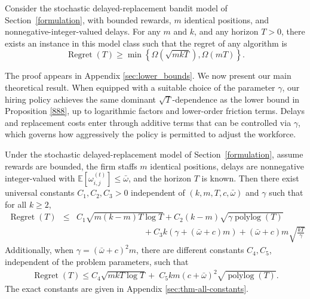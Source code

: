 \documentclass[opre,blindrev]{informs3}
\newcommand{\polylog}{\operatorname{polylog}}
\newcommand{\Regret}{\operatorname{Regret}}
\begin{document}
\begin{proposition} 
\label{888}
Consider the stochastic delayed-replacement bandit model of Section~\ref{formulation}, with bounded rewards, \(m\) identical positions, and nonnegative-integer-valued delays. For any \(m\) and \(k\), and any horizon \(T > 0\), there exists an instance in this model class such that the regret of any algorithm is
\begin{equation*}
    \Regret(T) \geq \min \left\{\Omega\left(\sqrt{mkT}\right), \Omega\left(mT\right) \right\}.
\end{equation*}
\end{proposition}

The proof appears in Appendix \ref{sec:lower_bounds}. We now present our main theoretical result. When equipped with a suitable choice of the parameter \(\gamma\), our hiring policy achieves the same dominant \(\sqrt{T}\)-dependence as the lower bound in Proposition \ref{888}, up to logarithmic factors and lower-order friction terms. Delays and replacement costs enter through additive terms that can be controlled via \(\gamma\), which governs how aggressively the policy is permitted to adjust the workforce. 

\begin{theorem}\label{thm:main}
    Under the stochastic delayed-replacement model of Section~\ref{formulation}, assume rewards are bounded, the firm staffs \(m\) identical positions, delays are nonnegative integer-valued with \(\mathbb E[\omega_{i,j}^{(t)}]\le \bar{\omega}\), and the horizon \(T\) is known. Then there exist universal constants \(C_1, C_2, C_3>0\) independent of \((k,m,T,c,\bar{\omega})\) and \(\gamma\) such that for all \(k\ge 2\),
    \begin{eqnarray}
    \label{099}
        \Regret(T) &\le&  C_1 \sqrt{m(k-m)T\log T} 
         + C_2(k-m)\sqrt{\gamma \polylog(T)} \\
        &&\qquad\qquad\qquad\qquad + C_3 k\left(\gamma + (\bar{\omega}+c)m\right)
        + (\bar{\omega}+c)m\sqrt{\frac{kT}{\gamma}}
        \nonumber
    \end{eqnarray}
    Additionally, when \(\gamma = (\bar{\omega}+c)^2m\), there are different constants \(C_4, C_5\), independent of the problem parameters, such that
  \begin{eqnarray}
      \Regret(T) \leq C_4 \sqrt{mkT\log T} 
        +\; C_5km(c+\bar{\omega})^2\sqrt{ \polylog(T)}.
        \label{088}
        \end{eqnarray}
    The exact constants are given in Appendix \ref{sec:thm-all-constants}.
\end{theorem}
\end{document}
